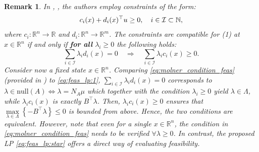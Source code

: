 \documentclass[letterpaper, 10 pt, conference]{ieeeconf}  %
\newtheorem{remark}{\textbf{Remark}}
\begin{document}
{\color{blue}
\begin{remark}
    In \cite[Thm. 2]{Molnar}, \cite[Lemma 1]{cohen2025compatibilitymultiplecontrolbarrier}, the authors employ constraints of the form:
    \begin{equation}
        c_i(x) + d_i(x)^\top u \ge 0, \quad i \in \mathcal{I} \subset \mathbb{N},\notag 
    \end{equation}
    where $c_i : \mathbb{R}^n \to \mathbb{R}$ and $d_i : \mathbb{R}^n \to \mathbb{R}^m$. The constraints are compatible for
 (1) at
    $x \in \mathbb{R}^n$ if and only if \textbf{\textit{for all}} $\lambda_i \ge 0$ the following holds:
\begin{equation}\label{eq:molner_condition_feas}
        \sum_{i \in \mathcal{I}} \lambda_i d_i(x) = 0
        \quad \Longrightarrow \quad
        \sum_{i \in \mathcal{I}} \lambda_i c_i(x) \ge 0.
    \end{equation}
    Consider now a fixed state $x\in\mathbb{R}^n$. Comparing \eqref{eq:molner_condition_feas} (provided in \cite[Thm. 2]{Molnar}) to \eqref{eq:feas_lp:1}, $\sum_{i \in \mathcal{I}} \lambda_i d_i(x) = 0$ corresponds to $\lambda \in\textrm{null}(A) \Leftrightarrow \lambda = N_A \mu$ which together with the condition $\lambda_i \ge 0$ yield $\lambda \in\Lambda$, while $\lambda_i c_i(x)$ is exactly $B^\top \lambda$. Then, $\lambda_i c_i(x) \ge 0$ ensures that $\underset{\lambda \in\Lambda}{\max}\left\{-B^\top \lambda\right\}\leq 0 $ is bounded from above. Hence, the two conditions are equivalent. 
     However, note that even for a single $x\in\mathbb{R}^n$, the condition in \eqref{eq:molner_condition_feas} needs to be verified $\forall \lambda \geq 0$. In contrast, the proposed LP \eqref{eq:feas_lp:star} offers a direct way of evaluating feasibility. 
\end{remark}
}
\end{document}
